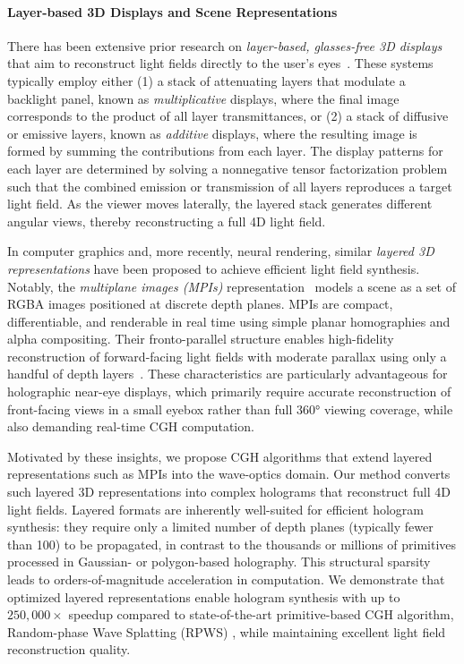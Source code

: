 \paragraph{\bf{Layer-based 3D Displays and Scene Representations}} There has been extensive prior research on \textit{layer-based, glasses-free 3D displays} that aim to reconstruct light fields directly to the user's eyes~\cite{lanman2010hr3d, wetzstein2012tensor, wetzstein2011layered3d, lee2016additivelf, wetzstein2012compressivelf, maimone2013focus3d, huang2015stereoscope}. These systems typically employ either (1) a stack of attenuating layers that modulate a backlight panel, known as \textit{multiplicative} displays, where the final image corresponds to the product of all layer transmittances, or (2) a stack of diffusive or emissive layers, known as \textit{additive} displays, where the resulting image is formed by summing the contributions from each layer. The display patterns for each layer are determined by solving a nonnegative tensor factorization problem such that the combined emission or transmission of all layers reproduces a target light field. As the viewer moves laterally, the layered stack generates different angular views, thereby reconstructing a full 4D light field.

In computer graphics and, more recently, neural rendering, similar \textit{layered 3D representations} have been proposed to achieve efficient light field synthesis. Notably, the \textit{multiplane images (MPIs)} representation~\cite{zhou2018mpi} models a scene as a set of RGBA images positioned at discrete depth planes. MPIs are compact, differentiable, and renderable in real time using simple planar homographies and alpha compositing. Their fronto-parallel structure enables high-fidelity reconstruction of forward-facing light fields with moderate parallax using only a handful of depth layers~\cite{flynn2019deepviewmpi, srinivasan2019pushingmpi, pu2023sinmpi, khan2023tiledmpi, han2022adaptivempi, tucker2020singlempi, zhao2022generativempi, luvizon2021adaptivempi}. These characteristics are particularly advantageous for holographic near-eye displays, which primarily require accurate reconstruction of front-facing views in a small eyebox rather than full 360° viewing coverage, while also demanding real-time CGH computation.

Motivated by these insights, we propose CGH algorithms that extend layered representations such as MPIs into the wave-optics domain. Our method converts such layered 3D representations into complex holograms that reconstruct full 4D light fields. Layered formats are inherently well-suited for efficient hologram synthesis: they require only a limited number of depth planes (typically fewer than 100) to be propagated, in contrast to the thousands or millions of primitives processed in Gaussian- or polygon-based holography. This structural sparsity leads to orders-of-magnitude acceleration in computation. We demonstrate that optimized layered representations enable hologram synthesis with up to $250,000\times$ speedup compared to state-of-the-art primitive-based CGH algorithm, Random-phase Wave Splatting (RPWS) \cite{chao2025rpws}, while maintaining excellent light field reconstruction quality.


